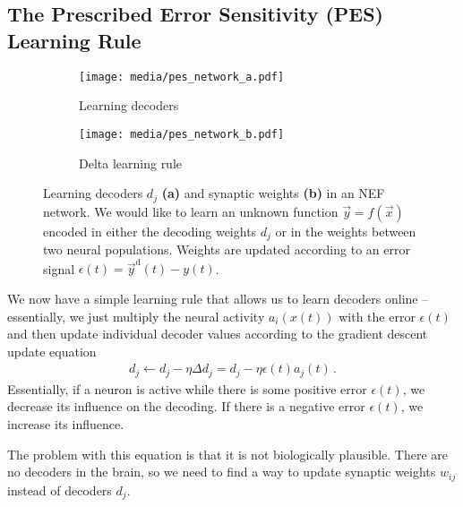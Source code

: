 \documentclass[10pt,letterpaper,oneside]{article}
\begin{document}


\subsection{The Prescribed Error Sensitivity (PES) Learning Rule}

\begin{figure}
	\centering%
	\begin{subfigure}{0.5\textwidth}%
		\centering%
		\texttt{[image: media/pes\_network\_a.pdf]}%
		\caption{Learning decoders}%
	\end{subfigure}%
	\begin{subfigure}{0.5\textwidth}%
		\centering%
		\texttt{[image: media/pes\_network\_b.pdf]}%
		\caption{Delta learning rule}%
	\end{subfigure}%
	\caption{Learning decoders $d_j$ \textbf{(a)} and synaptic weights \textbf{(b)} in an NEF network. We would like to learn an unknown function $\vec y = f(\vec x)$ encoded in either the decoding weights $d_j$ or in the weights between two neural populations. Weights are updated according to an error signal $\epsilon(t) = \vec y^\mathrm{d}(t) - y(t)$.}
\end{figure}

We now have a simple learning rule that allows us to learn decoders online -- essentially, we just multiply the neural activity $a_i(x(t))$ with the error $\epsilon(t)$ and then update individual decoder values according to the gradient descent update equation
\begin{align*}
	d_j \gets d_j -\eta \Delta d_j = d_j -\eta \epsilon(t) a_j(t) \,.
\end{align*}
Essentially, if a neuron is active while there is some positive error $\epsilon(t)$, we decrease its influence on the decoding. If there is a negative error $\epsilon(t)$, we increase its influence.

The problem with this equation is that it is not biologically plausible. There are no decoders in the brain, so we need to find a way to update synaptic weights $w_{ij}$ instead of decoders $d_j$.
\end{document}

